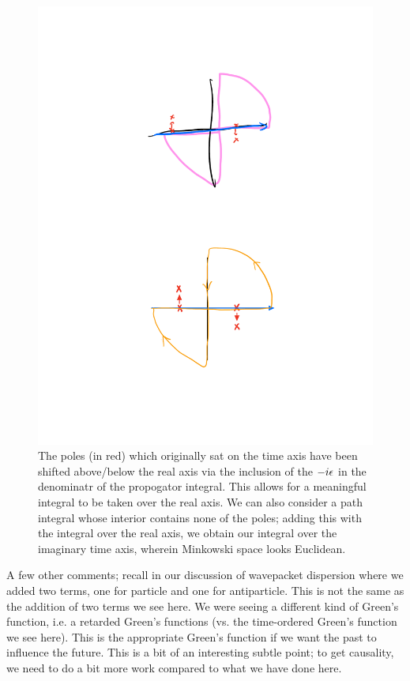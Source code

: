 \begin{figure}[htbp]
    \centering
    \includegraphics[scale=0.8]{Images/fig-propogatorcontour.pdf}
    \caption{The poles (in red) which originally sat on the time axis have been shifted above/below the real axis via the inclusion of the $-i\epsilon$ in the denominatr of the propogator integral. This allows for a meaningful integral to be taken over the real axis. We can also consider a path integral whose interior contains none of the poles; adding this with the integral over the real axis, we obtain our integral over the imaginary time axis, wherein Minkowski space looks Euclidean.}
    \label{fig-propogatorcontour}
\end{figure}

A few other comments; recall in our discussion of wavepacket dispersion where we added two terms, one for particle and one for antiparticle. This is not the same as the addition of two terms we see here. We were seeing a different kind of Green's function, i.e. a retarded Green's functions (vs. the time-ordered Green's function we see here). This is the appropriate Green's function if we want the past to influence the future. This is a bit of an interesting subtle point; to get causality, we need to do a bit more work compared to what we have done here.

